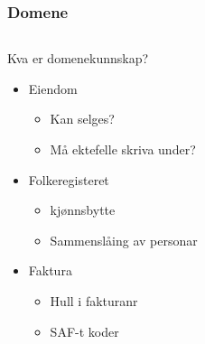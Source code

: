 \documentclass{beamer}
\begin{document}
    \begin{frame}
        \frametitle{Domene}
        \begin{columns}[c]
            \begin{column}{.55\textwidth}
                \begin{block}{Kva er domenekunnskap?}
                    \begin{itemize}
                        \item Eiendom
                        \begin{itemize}
                            \item Kan selges?
                            \item Må ektefelle skriva under?
                        \end{itemize}
                        \item Folkeregisteret
                        \begin{itemize}
                            \item kjønnsbytte
                            \item Sammenslåing av personar
                        \end{itemize}
                        \item Faktura
                        \begin{itemize}
                            \item Hull i fakturanr
                            \item SAF-t koder
                        \end{itemize}
                    \end{itemize}
                \end{block}
            \end{column}
            \begin{column}{.45\textwidth}
                \begin{center}

\end{center}
\end{column}
\end{columns}
\end{frame}
\end{document}
